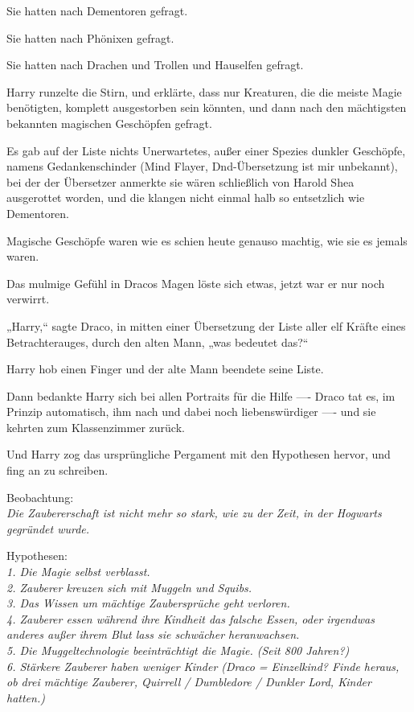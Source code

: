 {Sie hatten nach Dementoren gefragt.

Sie hatten nach Phönixen gefragt.

Sie hatten nach Drachen und Trollen und Hauselfen gefragt.

Harry runzelte die Stirn, und erklärte, dass nur Kreaturen, die die meiste Magie benötigten, komplett ausgestorben sein könnten, und dann nach den mächtigsten bekannten magischen Geschöpfen gefragt.

Es gab auf der Liste nichts Unerwartetes, außer einer Spezies dunkler Geschöpfe, namens Gedankenschinder (Mind Flayer, Dnd-Übersetzung ist mir unbekannt), bei der der Übersetzer anmerkte sie wären schließlich von Harold Shea ausgerottet worden, und die klangen nicht einmal halb so entsetzlich wie Dementoren.

Magische Geschöpfe waren wie es schien heute genauso machtig, wie sie es jemals waren.

Das mulmige Gefühl in Dracos Magen löste sich etwas, jetzt war er nur noch verwirrt.

„Harry,“ sagte Draco, in mitten einer Übersetzung der Liste aller elf Kräfte eines Betrachterauges, durch den alten Mann, „was bedeutet das?“

Harry hob einen Finger und der alte Mann beendete seine Liste.

Dann bedankte Harry sich bei allen Portraits für die Hilfe ---- Draco tat es, im Prinzip automatisch, ihm nach und dabei noch liebenswürdiger ---- und sie kehrten zum Klassenzimmer zurück.

Und Harry zog das ursprüngliche Pergament mit den Hypothesen hervor, und fing an zu schreiben.

Beobachtung:\\ \emph{Die Zaubererschaft ist nicht mehr so stark, wie zu der Zeit, in der Hogwarts gegründet wurde.}

Hypothesen:\\ \emph{1\emph{. Die Magie selbst verblasst.}}\\ \emph{2. Zauberer \emph{kreuzen sich mit Muggeln und Squibs.}}\\ \emph{3. Das Wissen um mächtige Zaubersprüche geht verloren.}\\ \emph{4. Zauberer essen während ihre Kindheit das falsche Essen, oder irgendwas anderes außer ihrem Blut lass sie schwächer heranwachsen.}\\ \emph{5. Die Muggeltechnologie beeinträchtigt die Magie. (Seit 800 Jahren?)}\\ \emph{6. Stärkere Zauberer haben weniger Kinder (Draco = Einzelkind? Finde heraus, ob drei mächtige Zauberer, Quirrell / Dumbledore / Dunkler Lord, Kinder hatten.)}

}
